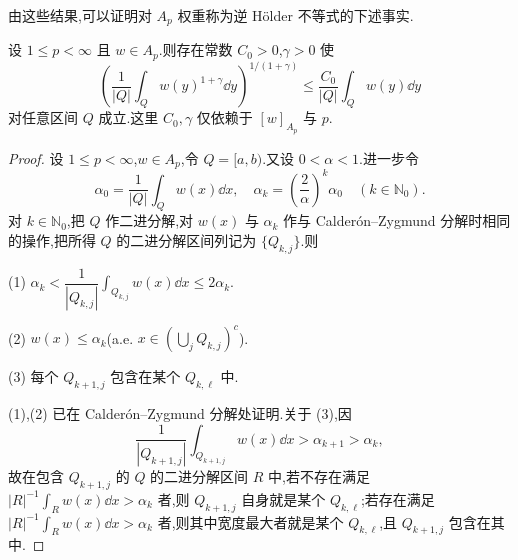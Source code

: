 由这些结果,可以证明对 $A_{p}$ 权重称为逆 Hölder 不等式的下述事实.

\begin{theorem}\label{thm:1.11.6}
设 $1 \leq p < \infty$ 且 $w \in A_{p}$.则存在常数 $C_{0} > 0$,$\gamma > 0$ 使
\begin{equation}\tag{1.11.12}
\left(\frac{1}{|Q|}\int_{Q}w(y)^{1+\gamma}\dd y\right)^{1/(1+\gamma)} \leq \frac{C_{0}}{|Q|}\int_{Q}w(y)\dd y
\label{eq:1.11.12}\end{equation}
对任意区间 $Q$ 成立.这里 $C_{0}, \gamma$ 仅依赖于 $[w]_{A_{p}}$ 与 $p$.
\end{theorem}

\begin{proof}
设 $1 \leq p < \infty$,$w \in A_{p}$,令 $Q = [a, b)$.又设 $0 < \alpha < 1$.进一步令
\begin{equation*}
\alpha_{0} = \frac{1}{|Q|}\int_{Q}w(x)\dd x, \quad \alpha_{k} = \left(\frac{2}{\alpha}\right)^{k}\alpha_{0} \quad (k \in \mathbb{N}_{0}).
\end{equation*}
对 $k \in \mathbb{N}_{0}$,把 $Q$ 作二进分解,对 $w(x)$ 与 $\alpha_{k}$ 作与 Calderón--Zygmund 分解时相同的操作,把所得 $Q$ 的二进分解区间列记为 $\{Q_{k,j}\}$.则

(1) $\alpha_{k} < \dfrac{1}{|Q_{k,j}|}\displaystyle\int_{Q_{k,j}}w(x)\dd x \leq 2\alpha_{k}$.

(2) $w(x) \leq \alpha_{k}$(a.e. $x \in \left(\bigcup_{j}Q_{k,j}\right)^{c}$).

(3) 每个 $Q_{k+1,j}$ 包含在某个 $Q_{k,\ell}$ 中.

(1),(2) 已在 Calderón--Zygmund 分解处证明.关于 (3),因
\begin{equation*}
\frac{1}{|Q_{k+1,j}|}\int_{Q_{k+1,j}}w(x)\dd x > \alpha_{k+1} > \alpha_{k},
\end{equation*}
故在包含 $Q_{k+1,j}$ 的 $Q$ 的二进分解区间 $R$ 中,若不存在满足 $|R|^{-1}\int_{R}w(x)\dd x > \alpha_{k}$ 者,则 $Q_{k+1,j}$ 自身就是某个 $Q_{k,\ell}$;若存在满足 $|R|^{-1}\int_{R}w(x)\dd x > \alpha_{k}$ 者,则其中宽度最大者就是某个 $Q_{k,\ell}$,且 $Q_{k+1,j}$ 包含在其中.


\end{proof}
